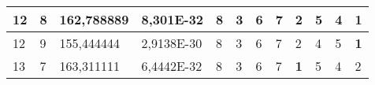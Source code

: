 \documentclass[conference]{IEEEtran}
\begin{document}
\begin{table*}[]
\begin{tabular}{|llll|llllllll|}
\multicolumn{1}{|l|}{12}                                                    & \multicolumn{1}{l|}{8}                                                        & \multicolumn{1}{l|}{162,788889}                                                   & 8,301E-32                      & \multicolumn{1}{l|}{8}                                                  & \multicolumn{1}{l|}{3}                                                  & \multicolumn{1}{l|}{6}                                                  & \multicolumn{1}{l|}{7}                                                  & \multicolumn{1}{l|}{2}                                                  & \multicolumn{1}{l|}{5}                                                  & \multicolumn{1}{l|}{4}                                                  & \textbf{1}                 \\ \hline
\multicolumn{1}{|l|}{12}                                                    & \multicolumn{1}{l|}{9}                                                        & \multicolumn{1}{l|}{155,444444}                                                   & 2,9138E-30                     & \multicolumn{1}{l|}{8}                                                  & \multicolumn{1}{l|}{3}                                                  & \multicolumn{1}{l|}{6}                                                  & \multicolumn{1}{l|}{7}                                                  & \multicolumn{1}{l|}{2}                                                  & \multicolumn{1}{l|}{4}                                                  & \multicolumn{1}{l|}{5}                                                  & \textbf{1}                 \\ \hline
\multicolumn{1}{|l|}{13}                                                    & \multicolumn{1}{l|}{7}                                                        & \multicolumn{1}{l|}{163,311111}                                                   & 6,4442E-32                     & \multicolumn{1}{l|}{8}                                                  & \multicolumn{1}{l|}{3}                                                  & \multicolumn{1}{l|}{6}                                                  & \multicolumn{1}{l|}{7}                                                  & \multicolumn{1}{l|}{\textbf{1}}                                         & \multicolumn{1}{l|}{5}                                                  & \multicolumn{1}{l|}{4}                                                  & 2                          \\ \hline

\end{tabular}
\end{table*}
\end{document}
